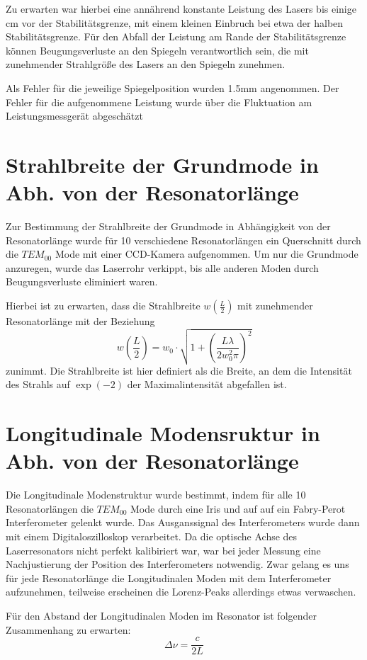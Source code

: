 \documentclass[bigchapter,colorback,accentcolor=tud4b,linedtoc,11pt]{tudreport}
\numberwithin{equation}{subsection}
\begin{document}
Zu erwarten war hierbei eine annährend konstante Leistung des Lasers bis einige cm vor der Stabilitätsgrenze, mit einem kleinen Einbruch bei etwa der halben Stabilitätsgrenze.
Für den Abfall der Leistung am Rande der Stabilitätsgrenze können Beugungsverluste an den Spiegeln verantwortlich sein, die mit zunehmender Strahlgröße des Lasers an den Spiegeln zunehmen.

Als Fehler für die jeweilige Spiegelposition wurden 1.5mm angenommen. Der Fehler für die aufgenommene Leistung wurde über die Fluktuation am Leistungsmessgerät abgeschätzt

\FloatBarrier
\section{Strahlbreite der Grundmode in Abh. von der Resonatorlänge}
Zur Bestimmung der Strahlbreite der Grundmode in Abhängigkeit von der Resonatorlänge wurde für 10 verschiedene Resonatorlängen ein Querschnitt durch die $TEM_{00}$ Mode mit einer CCD-Kamera aufgenommen. Um nur die Grundmode anzuregen, wurde das Laserrohr verkippt, bis alle anderen Moden durch Beugungsverluste eliminiert waren.

Hierbei ist zu erwarten, dass die Strahlbreite $w\left(\frac{L}{2}\right)$ mit zunehmender Resonatorlänge mit der Beziehung 
$$w\left(\frac{L}{2}\right)=w_0\cdot\sqrt{1+\left({\frac{L\lambda}{2w_{0}^{2}\pi}}\right)^2}$$
zunimmt.
Die Strahlbreite ist hier definiert als die Breite, an dem die Intensität des Strahls auf $\exp(-2)$ der Maximalintensität abgefallen ist.

\FloatBarrier
\section{Longitudinale Modensruktur in Abh. von der Resonatorlänge}
Die Longitudinale Modenstruktur wurde bestimmt, indem für alle 10 Resonatorlängen die $TEM_{00}$ Mode durch eine Iris und auf auf ein Fabry-Perot Interferometer gelenkt wurde. Das Ausganssignal des Interferometers wurde dann mit einem Digitaloszilloskop verarbeitet.
Da die optische Achse des Laserresonators nicht perfekt kalibiriert war, war bei jeder Messung eine Nachjustierung der Position des Interferometers notwendig. Zwar gelang es uns für jede Resonatorlänge die Longitudinalen Moden mit dem Interferometer aufzunehmen, teilweise erscheinen die Lorenz-Peaks allerdings etwas verwaschen.

Für den Abstand der Longitudinalen Moden im Resonator ist folgender Zusammenhang zu erwarten:
$$\Delta\nu=\frac{c}{2L}$$
\FloatBarrier
\newpage
\end{document}
